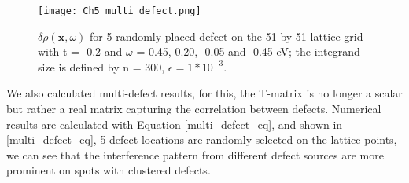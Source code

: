 \begin{figure}
	\centering
	\texttt{[image: Ch5\_multi\_defect.png]} 
	\caption{$\delta\rho(\textbf{x},\omega)$ for 5 randomly placed defect on the 51 by 51 lattice grid with t = -0.2 and $\omega$ = 0.45, 0.20, -0.05 and -0.45 eV; the integrand size is defined by n = 300, $\epsilon = 1*10^{-3}$. }
	\label{fig:ch5_multi_scattering}
\end{figure}

We also calculated multi-defect results, for this, the T-matrix is no longer a scalar but rather a real matrix capturing the correlation between defects. Numerical results are calculated with Equation \ref{multi_defect_eq}, and shown in \ref{multi_defect_eq}, 5 defect locations are randomly selected on the lattice points, we can see that the interference pattern from different defect sources are more prominent on spots with clustered defects. 




%
